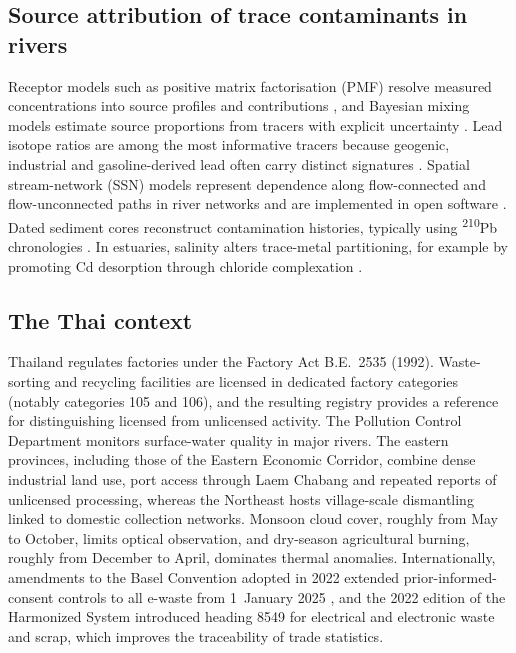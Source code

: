 \documentclass[10pt]{article}
\begin{document}
\subsection{Source attribution of trace contaminants in rivers}
Receptor models such as positive matrix factorisation (PMF) resolve measured concentrations into source profiles and contributions \citep{paatero1994,norris2014}, and Bayesian mixing models estimate source proportions from tracers with explicit uncertainty \citep{stock2018}. Lead isotope ratios are among the most informative tracers because geogenic, industrial and gasoline-derived lead often carry distinct signatures \citep{komarek2008}. Spatial stream-network (SSN) models represent dependence along flow-connected and flow-unconnected paths in river networks \citep{verhoef2010,peterson2013} and are implemented in open software \citep{dumelle2024}. Dated sediment cores reconstruct contamination histories, typically using \textsuperscript{210}Pb chronologies \citep{appleby1978}. In estuaries, salinity alters trace-metal partitioning, for example by promoting Cd desorption through chloride complexation \citep{dulaing2009}.

\subsection{The Thai context}
Thailand regulates factories under the Factory Act B.E.~2535 (1992). Waste-sorting and recycling facilities are licensed in dedicated factory categories (notably categories 105 and 106), and the resulting registry provides a reference for distinguishing licensed from unlicensed activity. The Pollution Control Department monitors surface-water quality in major rivers. The eastern provinces, including those of the Eastern Economic Corridor, combine dense industrial land use, port access through Laem Chabang and repeated reports of unlicensed processing, whereas the Northeast hosts village-scale dismantling linked to domestic collection networks. Monsoon cloud cover, roughly from May to October, limits optical observation, and dry-season agricultural burning, roughly from December to April, dominates thermal anomalies. Internationally, amendments to the Basel Convention adopted in 2022 extended prior-informed-consent controls to all e-waste from 1~January 2025 \citep{basel2022}, and the 2022 edition of the Harmonized System introduced heading 8549 for electrical and electronic waste and scrap, which improves the traceability of trade statistics.
\end{document}
